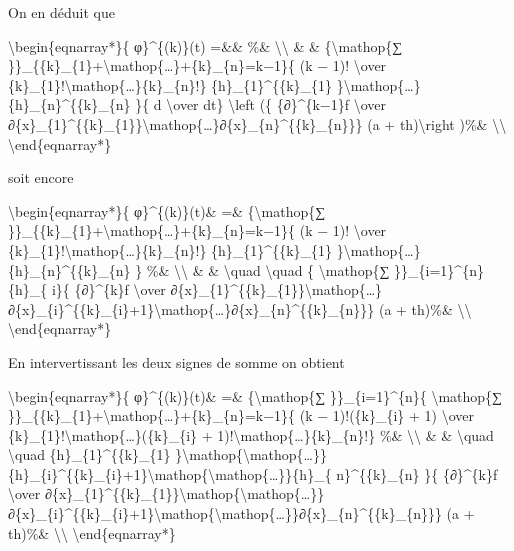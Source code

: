 \documentclass[]{article}
\begin{document}
On en déduit que

\textbackslash{}begin\{eqnarray*\}\{ φ\}\^{}\{(k)\}(t) =\&\& \%\&
\textbackslash{}\textbackslash{} \& \& \{\textbackslash{}mathop\{∑
\}\}\_\{\{k\}\_\{1\}+\textbackslash{}mathop\{\ldots{}\}+\{k\}\_\{n\}=k−1\}\{
(k − 1)! \textbackslash{}over
\{k\}\_\{1\}!\textbackslash{}mathop\{\ldots{}\}\{k\}\_\{n\}!\}
\{h\}\_\{1\}\^{}\{\{k\}\_\{1\}
\}\textbackslash{}mathop\{\ldots{}\}\{h\}\_\{n\}\^{}\{\{k\}\_\{n\} \}\{
d \textbackslash{}over dt\} \textbackslash{}left (\{ \{∂\}\^{}\{k−1\}f
\textbackslash{}over
∂\{x\}\_\{1\}\^{}\{\{k\}\_\{1\}\}\textbackslash{}mathop\{\ldots{}\}∂\{x\}\_\{n\}\^{}\{\{k\}\_\{n\}\}\}
(a + th)\textbackslash{}right )\%\& \textbackslash{}\textbackslash{}
\textbackslash{}end\{eqnarray*\}

soit encore

\textbackslash{}begin\{eqnarray*\}\{ φ\}\^{}\{(k)\}(t)\& =\&
\{\textbackslash{}mathop\{∑
\}\}\_\{\{k\}\_\{1\}+\textbackslash{}mathop\{\ldots{}\}+\{k\}\_\{n\}=k−1\}\{
(k − 1)! \textbackslash{}over
\{k\}\_\{1\}!\textbackslash{}mathop\{\ldots{}\}\{k\}\_\{n\}!\}
\{h\}\_\{1\}\^{}\{\{k\}\_\{1\}
\}\textbackslash{}mathop\{\ldots{}\}\{h\}\_\{n\}\^{}\{\{k\}\_\{n\} \}
\%\& \textbackslash{}\textbackslash{} \& \& \textbackslash{}quad
\textbackslash{}quad \{ \textbackslash{}mathop\{∑
\}\}\_\{i=1\}\^{}\{n\}\{h\}\_\{ i\}\{ \{∂\}\^{}\{k\}f
\textbackslash{}over
∂\{x\}\_\{1\}\^{}\{\{k\}\_\{1\}\}\textbackslash{}mathop\{\ldots{}\}∂\{x\}\_\{i\}\^{}\{\{k\}\_\{i\}+1\}\textbackslash{}mathop\{\ldots{}\}∂\{x\}\_\{n\}\^{}\{\{k\}\_\{n\}\}\}
(a + th)\%\& \textbackslash{}\textbackslash{}
\textbackslash{}end\{eqnarray*\}

En intervertissant les deux signes de somme on obtient

\textbackslash{}begin\{eqnarray*\}\{ φ\}\^{}\{(k)\}(t)\& =\&
\{\textbackslash{}mathop\{∑ \}\}\_\{i=1\}\^{}\{n\}\{
\textbackslash{}mathop\{∑
\}\}\_\{\{k\}\_\{1\}+\textbackslash{}mathop\{\ldots{}\}+\{k\}\_\{n\}=k−1\}\{
(k − 1)!(\{k\}\_\{i\} + 1) \textbackslash{}over
\{k\}\_\{1\}!\textbackslash{}mathop\{\ldots{}\}(\{k\}\_\{i\} +
1)!\textbackslash{}mathop\{\ldots{}\}\{k\}\_\{n\}!\} \%\&
\textbackslash{}\textbackslash{} \& \& \textbackslash{}quad
\textbackslash{}quad \{h\}\_\{1\}\^{}\{\{k\}\_\{1\}
\}\textbackslash{}mathop\{\textbackslash{}mathop\{\ldots{}\}\}\{h\}\_\{i\}\^{}\{\{k\}\_\{i\}+1\}\textbackslash{}mathop\{\textbackslash{}mathop\{\ldots{}\}\}\{h\}\_\{
n\}\^{}\{\{k\}\_\{n\} \}\{ \{∂\}\^{}\{k\}f \textbackslash{}over
∂\{x\}\_\{1\}\^{}\{\{k\}\_\{1\}\}\textbackslash{}mathop\{\textbackslash{}mathop\{\ldots{}\}\}∂\{x\}\_\{i\}\^{}\{\{k\}\_\{i\}+1\}\textbackslash{}mathop\{\textbackslash{}mathop\{\ldots{}\}\}∂\{x\}\_\{n\}\^{}\{\{k\}\_\{n\}\}\}
(a + th)\%\& \textbackslash{}\textbackslash{}
\textbackslash{}end\{eqnarray*\}
\end{document}

